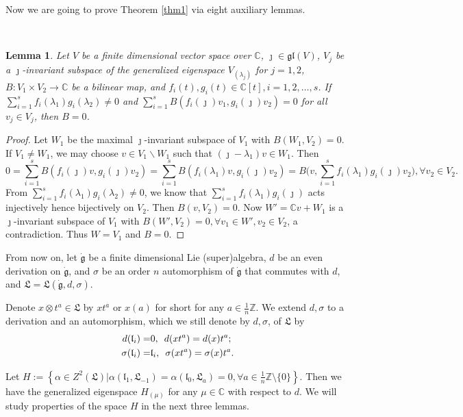 \documentclass[1p]{elsarticle}
\numberwithin{equation}{section}
\def\gl{\mathfrak{gl}}
\def\dg{\dot{\mathfrak{g}}}
\def\fL{\mathfrak{L}}
\def\bC{\mathbb{C}}
\def\bZ{\mathbb{Z}}
\def\fl{\mathfrak{l}}
\newtheorem{lemm}[theo]{Lemma}
\begin{document}
Now we are going to prove  Theorem \ref{thm1} via eight auxiliary  lemmas.

\

\begin{lemm}\label{zero}Let $V$ be a finite dimensional vector space over $\bC$, $\jmath\in \gl(V)$, $V_{j}$ be a $\jmath$-invariant subspace of the generalized  eigenspace $V_{(\lambda_j)}$ for $j=1,2$,  $B: V_{1}\times V_{2}\rightarrow \bC $ be a bilinear map, and $f_i(t), g_i(t)\in \bC[t],i=1,2,\ldots,s$. If $\sum_{i=1}^s f_i(\lambda_1)g_i(\lambda_2)\ne 0$ and  $\sum_{i=1}^s B(f_i(\jmath)v_1,g_i(\jmath)v_2)=0$ for all $v_j\in V_j$, then $B=0$.\end{lemm}

\begin{proof}Let $W_1$ be the maximal $\jmath$-invariant subspace of $V_1$ with $B(W_1,V_2)=0$. If $V_1\ne W_1$, we may choose $v\in V_1\backslash W_1$ such that $(\jmath-\lambda_1)v\in W_1$. Then $$0=\sum_{i=1}^sB(f_i(\jmath)v,g_i(\jmath)v_2)=\sum_{i=1}^sB(f_i(\lambda_1)v,g_i(\jmath)v_2)= B\big(v,\sum_{i=1}^s f_i(\lambda_1)g_i(\jmath)v_2\big),\forall v_2\in V_2.$$ From $\sum_{i=1}^s f_i(\lambda_1)g_i(\lambda_2)\ne 0$, we know that  $\sum_{i=1}^s f_i(\lambda_1)g_i(\jmath)$ acts injectively hence bijectively on $V_2$. Then $B(v,V_2)=0$.  Now $W'=\bC v+ W_1$ is a $\jmath$-invariant subspace of $V_1$ with  $B(W', V_2)=0,\forall v_1\in W',v_2\in V_2$, a contradiction. Thus $W=V_1$ and $B=0$.\end{proof}


From now on, let $\dg$ be a finite dimensional Lie (super)algebra, $d$ be an even derivation on $\dg$, and $\sigma$ be an order $n$ automorphism of $\dg$ that commutes with $d$, and $\fL=\fL(\dg,d,\sigma)$.

Denote $x\otimes t^a\in\fL$ by $xt^a$ or $x(a)$ for short for any $a\in \frac 1n \bZ$. We extend $d,\sigma$ to a derivation and an automorphism, which we still denote by $d,\sigma$, of $\fL$ by
\begin{equation}\label{d-sigma}
\aligned d(\fl_i)=&0,  \,\,\,d(x t^a)=d(x) t^a;\\ \sigma(\fl_i)=&\fl_i, \,\,\,\sigma(xt^a)=\sigma(x)t^a.\endaligned\end{equation}

Let $H:=\left\{\alpha\in Z^2(\fL)|\alpha(\fl_1,\fL_{-1})=\alpha(\fl_0,\fL_a)=0, \forall a\in \frac 1n \bZ\setminus\{ 0\}\right\}$. Then we have the generalized eigenspace $H_{(\mu)}$ for any $ \mu\in \bC$ with respect to $d$. We will study properties of the space $H$ in the next three lemmas.
\end{document}

